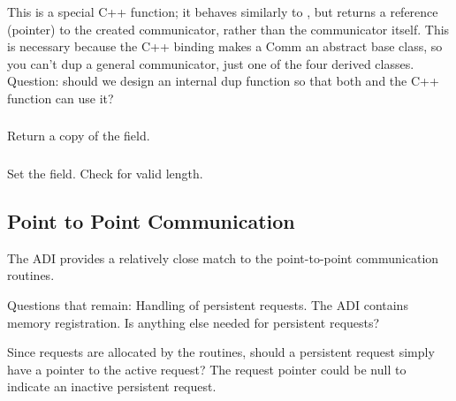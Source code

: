 \documentclass{article}
\begin{document}
\subsubsection{}

\subsubsection{}

\subsubsection{}
This is a special C++ function; it behaves similarly to
, but returns a reference (pointer) to the created
communicator, rather than the communicator itself.  This is necessary because
the C++ binding makes a Comm an abstract base class, so you can't dup a
general communicator, just one of the four derived classes.
Question: should we design an internal dup function so that both
 and the C++  function can use it?

\subsubsection{}
Return a copy of the  field.

\subsubsection{}
Set the  field.  Check for valid length.

\subsection{Point to Point Communication}

The ADI provides a relatively close match to the point-to-point
communication routines.  

Questions that remain:  Handling of persistent requests.  The ADI
contains memory registration.  Is anything else needed for persistent
requests? 

Since requests are allocated by the  routines,
should a persistent request simply have a pointer to the active request?  The
request pointer could be null to indicate an inactive persistent request.
\end{document}
